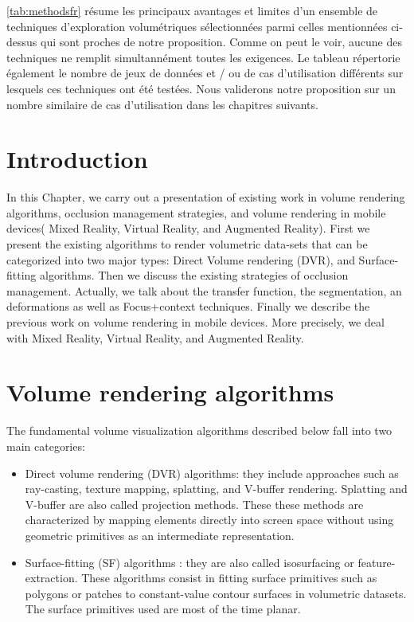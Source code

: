 \autoref{tab:methodsfr} résume les principaux avantages et limites d'un ensemble de techniques d'exploration volumétriques sélectionnées parmi celles mentionnées ci-dessus qui sont proches de notre proposition. Comme on peut le voir, aucune des techniques ne remplit simultannément  toutes les exigences. Le tableau répertorie également le nombre de jeux de données et / ou de cas d'utilisation différents sur lesquels ces techniques ont été testées. Nous validerons notre proposition sur un nombre similaire de cas d'utilisation dans les chapitres suivants.

\NewPage

\section{Introduction}

In this Chapter, we carry out a presentation of existing work in volume rendering algorithms, occlusion management strategies, and volume rendering in mobile devices( Mixed Reality, Virtual Reality, and Augmented Reality). First we present the existing algorithms to render volumetric data-sets that can be categorized into two major types: Direct Volume rendering (DVR), and Surface-fitting algorithms. Then we discuss the existing strategies of occlusion management. Actually, we talk about the transfer function, the segmentation, an deformations as well as Focus+context techniques. Finally we  describe the previous work on  volume rendering in mobile devices. More precisely, we deal with Mixed Reality, Virtual Reality, and Augmented Reality.



\section{Volume rendering algorithms}

The fundamental volume visualization algorithms described
below fall into two main categories: 

\begin{itemize}

\item Direct volume rendering (DVR) algorithms: they include approaches such as ray-casting, texture mapping, splatting, and V-buffer rendering. Splatting and V-buffer are also called projection methods. These these methods are characterized by mapping elements directly into screen space without using geometric primitives as an intermediate representation.

\item Surface-fitting (SF) algorithms : they are also called isosurfacing or feature-extraction. These algorithms consist in fitting surface primitives such as
polygons or patches to constant-value contour surfaces in volumetric datasets. The surface primitives used are most of the time planar.

\end{itemize}

